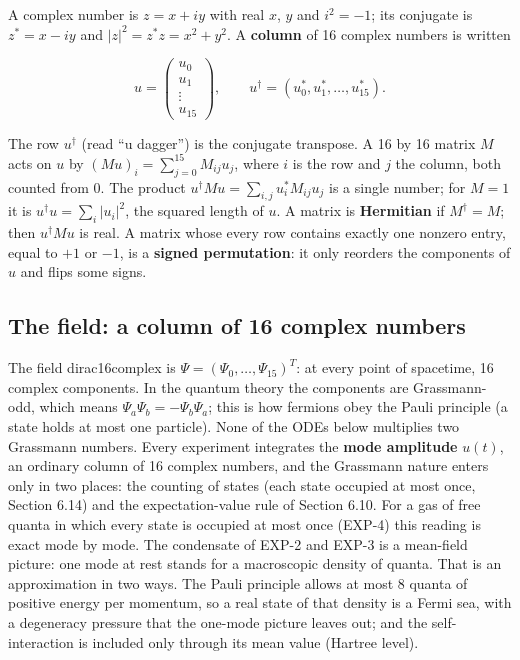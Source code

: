 \documentclass[11pt]{article}
\begin{document}
A complex number is $z=x+iy$ with real $x$, $y$ and $i^2=-1$; its conjugate is $z^*=x-iy$ and $|z|^2=z^*z=x^2+y^2$. A \textbf{column} of 16 complex numbers is written

\[
u=\begin{pmatrix}u_0\\ u_1\\ \vdots\\ u_{15}\end{pmatrix},\qquad u^\dagger=(u_0^*,u_1^*,\dots,u_{15}^*).
\]

The row $u^\dagger$ (read ``u dagger'') is the conjugate transpose. A 16 by 16 matrix $M$ acts on $u$ by $(Mu)_i=\sum_{j=0}^{15}M_{ij}u_j$, where $i$ is the row and $j$ the column, both counted from 0. The product $u^\dagger Mu=\sum_{i,j}u_i^*M_{ij}u_j$ is a single number; for $M=1$ it is $u^\dagger u=\sum_i|u_i|^2$, the squared length of $u$. A matrix is \textbf{Hermitian} if $M^\dagger=M$; then $u^\dagger Mu$ is real. A matrix whose every row contains exactly one nonzero entry, equal to $+1$ or $-1$, is a \textbf{signed permutation}: it only reorders the components of $u$ and flips some signs.

\subsection{The field: a column of 16 complex numbers}

The field dirac16complex is $\Psi=(\Psi_0,\dots,\Psi_{15})^T$: at every point of spacetime, 16 complex components. In the quantum theory the components are Grassmann-odd, which means $\Psi_a\Psi_b=-\Psi_b\Psi_a$; this is how fermions obey the Pauli principle (a state holds at most one particle). None of the ODEs below multiplies two Grassmann numbers. Every experiment integrates the \textbf{mode amplitude} $u(t)$, an ordinary column of 16 complex numbers, and the Grassmann nature enters only in two places: the counting of states (each state occupied at most once, Section 6.14) and the expectation-value rule of Section 6.10. For a gas of free quanta in which every state is occupied at most once (EXP-4) this reading is exact mode by mode. The condensate of EXP-2 and EXP-3 is a mean-field picture: one mode at rest stands for a macroscopic density of quanta. That is an approximation in two ways. The Pauli principle allows at most 8 quanta of positive energy per momentum, so a real state of that density is a Fermi sea, with a degeneracy pressure that the one-mode picture leaves out; and the self-interaction is included only through its mean value (Hartree level).
\end{document}

